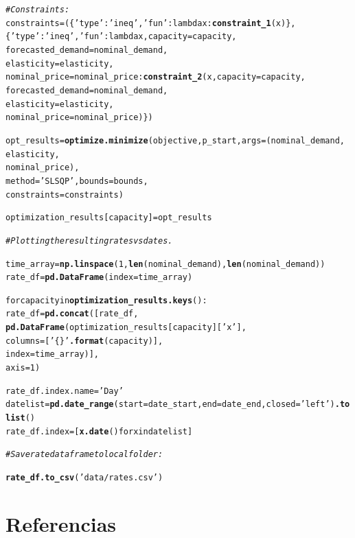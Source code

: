 \documentclass{article}\usepackage[]{graphicx}\usepackage[]{color}
\makeatletter
\newcommand{\hlstr}[1]{\textcolor[rgb]{0.192,0.494,0.8}{#1}}%
\newcommand{\hlcom}[1]{\textcolor[rgb]{0.678,0.584,0.686}{\textit{#1}}}%
\newcommand{\hlkwd}[1]{\textcolor[rgb]{0.737,0.353,0.396}{\textbf{#1}}}%
\newenvironment{kframe}{%
 \def\at@end@of@kframe{}%
 \ifinner\ifhmode%
  \def\at@end@of@kframe{\end{minipage}}%
  \begin{minipage}{\columnwidth}%
 \fi\fi%
 \def\FrameCommand##1{\hskip\@totalleftmargin \hskip-\fboxsep
 \colorbox{shadecolor}{##1}\hskip-\fboxsep
     \hskip-\linewidth \hskip-\@totalleftmargin \hskip\columnwidth}%
 \MakeFramed {\advance\hsize-\width
   \@totalleftmargin\z@ \linewidth\hsize
   \@setminipage}}%
 {\par\unskip\endMakeFramed%
 \at@end@of@kframe}
\newenvironment{knitrout}{}{} %
\makeatother
\begin{document}
\begin{knitrout}
\begin{kframe}
\begin{alltt}
\hlcom{    # Constraints:}
    constraints = (\{\hlstr{'type'}: \hlstr{'ineq'}, \hlstr{'fun'}:  lambda x:  \hlkwd{constraint_1}(x)\},
               \{\hlstr{'type'}: \hlstr{'ineq'}, \hlstr{'fun'}:  lambda x, capacity=capacity,
                                           forecasted_demand=nominal_demand,
                                           elasticity=elasticity,
                                           nominal_price=nominal_price: \hlkwd{constraint_2}(x,capacity=capacity,
                                                                                     forecasted_demand=nominal_demand,
                                                                                     elasticity=elasticity,
                                                                                     nominal_price=nominal_price)\})

    opt_results = \hlkwd{optimize.minimize}(objective, p_start, args=(nominal_demand,
                                                              elasticity,
                                                              nominal_price),
                                    method=\hlstr{'SLSQP'}, bounds=bounds,
                                    constraints=constraints)

    optimization_results[capacity] = opt_results
    
\hlcom{# Plotting the resulting rates vs dates.}

time_array = \hlkwd{np.linspace}(1,\hlkwd{len}(nominal_demand),\hlkwd{len}(nominal_demand))
rate_df = \hlkwd{pd.DataFrame}(index=time_array)

for capacity in \hlkwd{optimization_results.keys}():
    rate_df = \hlkwd{pd.concat}([rate_df,
                         \hlkwd{pd.DataFrame}(optimization_results[capacity][\hlstr{'x'}],
                                      columns=[\hlstr{'\{\}'}\hlkwd{.format}(capacity)],
                                      index=time_array)],
                        axis=1)

rate_df.index.name = \hlstr{'Day'}
datelist = \hlkwd{pd.date_range}(start=date_start, end=date_end, closed=\hlstr{'left'})\hlkwd{.tolist}()
rate_df.index = [ \hlkwd{x.date}() for x in datelist]

\hlcom{# Save rate dataframe to local folder:}

\hlkwd{rate_df.to_csv}(\hlstr{'data/rates.csv'})
\end{alltt}
\end{kframe}
\end{knitrout}

\section{Referencias}
\end{document}
